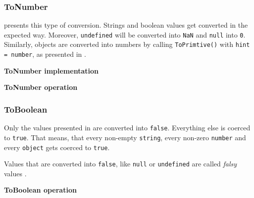 \subsubsection{ToNumber}
 presents this type of conversion. Strings and boolean values get converted in the expected way. Moreover, \texttt{undefined} will be converted into \texttt{NaN} and \texttt{null} into \texttt{0}. Similarly, objects are converted into numbers by calling \texttt{ToPrimtive()} with \texttt{hint = number}, as presented in .

\begin{code}
	\captionsetup{aboveskip=0pt, belowskip=10pt}
	\caption[ToNumber implementation]{\textbf{ToNumber implementation}}
	\label{code:background-to-number-implementation}
\end{code}

\begin{code}
	\captionsetup{aboveskip=0pt, belowskip=10pt}
	\caption[ToNumber operation]{\textbf{ToNumber operation}}
	\label{code:background-to-number-operation}
\end{code}


\subsubsection{ToBoolean}
Only the values presented in  are converted into \texttt{false}. Everything else is coerced to \texttt{true}. That means, that every non-empty \texttt{string}, every non-zero \texttt{number} and every \texttt{object} gets coerced to \texttt{true}.

Values that are converted into \texttt{false}, like \texttt{null} or \texttt{undefined} are called \textit{falsy} values \citep{you-dont-know-js}.

\begin{code}
	\captionsetup{aboveskip=0pt, belowskip=10pt}
	\caption[ToBoolean operation]{\textbf{ToBoolean operation}}
	\label{code:background-to-boolean-operation}
\end{code}

